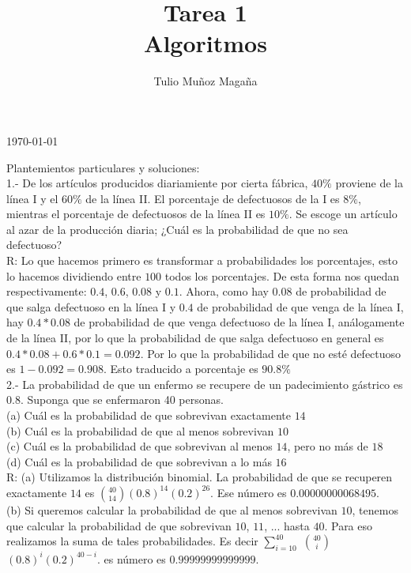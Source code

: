 \documentclass{article}
\begin{document}
\title{Tarea 1\\
	\large Algoritmos}
\author{Tulio Muñoz Magaña}
\today
\maketitle


Plantemientos particulares y soluciones:\\

1.- De los artículos producidos diariamiente por cierta fábrica, $40\%$ proviene de la línea I y el $60\%$ de la línea II. El porcentaje de defectuosos de la I es $8\%$, mientras el porcentaje de defectuosos de la línea II es $10\%$. Se escoge un artículo al azar de la producción diaria; ¿Cuál es la probabilidad de que no sea defectuoso?\\

R: Lo que hacemos primero es transformar a probabilidades los porcentajes, esto lo hacemos dividiendo entre $100$ todos los porcentajes. De esta forma nos quedan respectivamente: $0.4$, $0.6$, $0.08$ y $0.1$. Ahora, como hay $0.08$ de probabilidad de que salga defectuoso en la línea I y  $0.4$ de probabilidad de que venga de la línea I, hay $0.4*0.08$ de probabilidad de que venga defectuoso de la línea I, análogamente de la línea II, por lo que la probabilidad de que salga defectuoso en general es $0.4*0.08 + 0.6*0.1 = 0.092$. Por lo que la probabilidad de que no esté defectuoso es $1-0.092 = 0.908$. Esto traducido a porcentaje es $90.8\%$\\

2.- La probabilidad de que un enfermo se recupere de un padecimiento gástrico es $0.8$. Suponga que se enfermaron 40 personas.\\
(a) Cuál es la probabilidad de que sobrevivan exactamente $14$\\
(b) Cuál es la probabilidad de que al menos sobrevivan $10$\\
(c) Cuál es la probabilidad de que sobrevivan al menos $14$, pero no más de $18$\\
(d) Cuál es la probabilidad de que sobrevivan a lo más $16$\\

R: (a) Utilizamos la distribución binomial. La probabilidad de que se recuperen exactamente $14$ es ${40}\choose{14} $$(0.8)^{14}(0.2)^{26}$. Ese número es $0.00000000068495$.\\

(b) Si queremos calcular la probabilidad de que al menos sobrevivan $10$, tenemos que calcular la probabilidad de que sobrevivan $10$, $11$, ... hasta $40$. Para eso realizamos la suma de tales probabilidades. Es decir $ \sum\limits_{i=10}^{40}$ ${40}\choose{i}$$(0.8)^{i}(0.2)^{40-i}$. es número es $0.99999999999999$.\\
\end{document}
